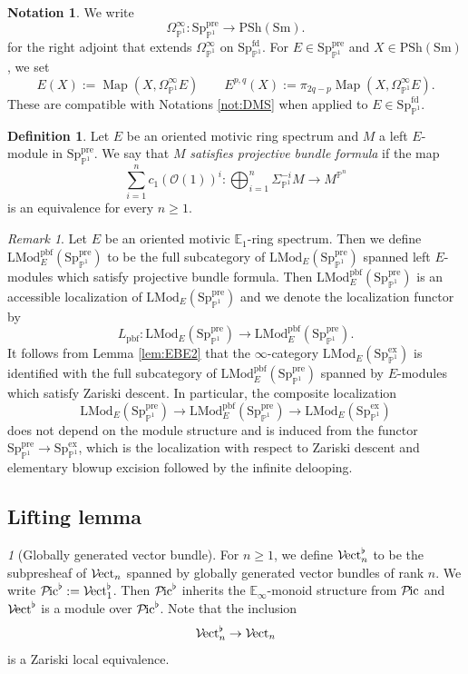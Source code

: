 \documentclass{amsart}
\theoremstyle{plain}
\theoremstyle{definition}
\newtheorem{definition}[theorem]{Definition}
\newtheorem{notation}[theorem]{Notation}
\theoremstyle{remark}
\newtheorem{remark}[theorem]{Remark}
\newtheorem{p}[theorem]{}
\numberwithin{equation}{theorem}
\newcommand{\mcal}[1]{\mathcal{#1}}
\newcommand{\mbb}[1]{\mathbb{#1}}
\newcommand{\LMod}{\mathrm{LMod}}
\newcommand{\PSh}{\mathrm{PSh}}
\newcommand{\Sm}{\mathrm{Sm}}
\newcommand{\ex}{\mathrm{ex}}
\newcommand{\fd}{\mathrm{fd}}
\newcommand{\pbf}{\mathrm{pbf}}
\newcommand{\pre}{\mathrm{pre}}
\newcommand{\OmegaP}{\Omega_{\mathbb{P}^1}}
\newcommand{\SigmaP}{\Sigma_{\mathbb{P}^1}}
\newcommand{\SpP}{\mathrm{Sp}_{\mathbb{P}^1}}
\newcommand{\Pic}{{\mathcal{P}\mspace{-2.0mu}\mathrm{ic}}}
\newcommand{\Vect}{{\mathcal{V}\mspace{-2.0mu}\mathrm{ect}}}
\newcommand{\Map}{\operatorname{Map}}
\begin{document}
\begin{notation}
We write
\[
	\OmegaP^\infty \colon \SpP^\pre \to \PSh(\Sm).
\]
for the right adjoint that extends $\OmegaP^\infty$ on $\SpP^\fd$.
For $E\in\SpP^\pre$ and $X\in\PSh(\Sm)$, we set
\[
	E(X) := \Map(X,\OmegaP^\infty E) \qquad
	E^{p,q}(X) := \pi_{2q-p}\Map(X,\OmegaP^\infty E).
\]
These are compatible with Notations \ref{not:DMS} when applied to $E\in\SpP^\fd$.
\end{notation}

\begin{definition}\label{def:PTh}
Let $E$ be an oriented motivic ring spectrum and $M$ a left $E$-module in $\SpP^\pre$.
We say that $M$ \textit{satisfies projective bundle formula} if the map
\[
	\sum_{i=1}^n c_1(\mcal{O}(1))^i \colon \bigoplus_{i=1}^n \SigmaP^{-i}M \to M^{\mbb{P}^n}
\]
is an equivalence for every $n\ge 1$.
\end{definition}

\begin{remark}\label{rem:PTh}
Let $E$ be an oriented motivic $\mbb{E}_1$-ring spectrum.
Then we define $\LMod^\pbf_E(\SpP^\pre)$ to be the full subcategory of $\LMod_E(\SpP^\pre)$ spanned left $E$-modules which satisfy projective bundle formula.
Then $\LMod^\pbf_E(\SpP^\pre)$ is an accessible localization of $\LMod_E(\SpP^\pre)$ and we denote the localization functor by
\[
	L_\pbf \colon \LMod_E(\SpP^\pre) \to \LMod^\pbf_E(\SpP^\pre).
\]
It follows from Lemma \ref{lem:EBE2} that the $\infty$-category $\LMod_E(\SpP^\ex)$ is identified with the full subcategory of $\LMod^\pbf_E(\SpP^\pre)$ spanned by $E$-modules which satisfy Zariski descent.
In particular, the composite localization
\[
	\LMod_E(\SpP^\pre) \to \LMod^\pbf_E(\SpP^\pre) \to \LMod_E(\SpP^\ex)
\]
does not depend on the module structure and is induced from the functor $\SpP^\pre\to\SpP^\ex$, which is the localization with respect to Zariski descent and elementary blowup excision followed by the infinite delooping.
\end{remark}


\subsection{Lifting lemma}\label{Lif}

\begin{p}[Globally generated vector bundle]
For $n\ge 1$, we define $\Vect_n^\flat$ to be the subpresheaf of $\Vect_n$ spanned by globally generated vector bundles of rank $n$.
We write $\Pic^\flat:=\Vect_1^\flat$.
Then $\Pic^\flat$ inherits the $\mbb{E}_\infty$-monoid structure from $\Pic$ and $\Vect^\flat$ is a module over $\Pic^\flat$.
Note that the inclusion
\[
	\Vect_n^\flat \to \Vect_n
\]
is a Zariski local equivalence.
\end{p}
\end{document}
